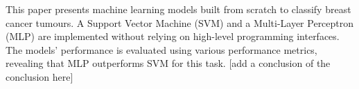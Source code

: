 This paper presents machine learning models built from scratch to classify breast cancer tumours. A Support Vector Machine (SVM) and a Multi-Layer Perceptron (MLP) are implemented without relying on high-level programming interfaces. The models' performance is evaluated using various performance metrics, revealing that MLP outperforms SVM for this task. [add a conclusion of the conclusion here]